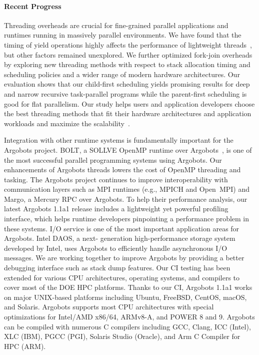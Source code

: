 \paragraph{Recent Progress}

Threading overheads are crucial for fine-grained parallel applications
and runtimes running in massively parallel environments.  We have
found that the timing of yield operations highly affects the
performance of lightweight threads~\cite{iwasaki2018}, but other
factors remained unexplored.  We further optimized fork-join overheads
by exploring new threading methods with respect to stack allocation
timing and scheduling policies and a wider range of modern hardware
architectures.  Our evaluation shows that our child-first scheduling
yields promising results for deep and narrow recursive task-parallel
programs while the parent-first scheduling is good for flat
parallelism.  Our study helps users and application developers choose
the best threading methods that fit their hardware architectures and
application workloads and maximize the scalability~\cite{iwasaki2020}.

Integration with other runtime systems is fundamentally important for
the Argobots project.  BOLT, a SOLLVE OpenMP runtime over
Argobots~\cite{BOLT}, is one of the most successful parallel
programming systems using Argobots.  Our enhancements of Argobots
threads lowers the cost of OpenMP threading and tasking.  The Argobots
project continues to improve interoperability with communication
layers such as MPI runtimes (e.g., MPICH and Open~MPI) and Margo, a
Mercury RPC over Argobots.  To help their performance analysis, our
latest Argobots 1.1a1 release includes a lightweight yet powerful
profiling interface, which helps runtime developers pinpointing a
performance problem in these systems.  I/O service is one of the most
important application areas for Argobots. Intel DAOS, a next-
generation high-performance storage system developed by Intel, uses
Argobots to efficiently handle asynchronous I/O messages.  We are
working together to improve Argobots by providing a better debugging
interface such as stack dump features. Our CI testing has been
extended for various CPU architectures, operating systems, and
compilers to cover most of the DOE HPC platforms.  Thanks to our CI,
Argobots 1.1a1 works on major UNIX-based platforms including Ubuntu,
FreeBSD, CentOS, macOS, and Solaris. Argobots supports most CPU
architectures with special optimizations for Intel/AMD x86/64,
ARMv8-A, and POWER 8 and 9. Argobots can be compiled with numerous C
compilers including GCC, Clang, ICC (Intel), XLC (IBM), PGCC (PGI),
Solaris Studio (Oracle), and Arm C Compiler for HPC (ARM).

